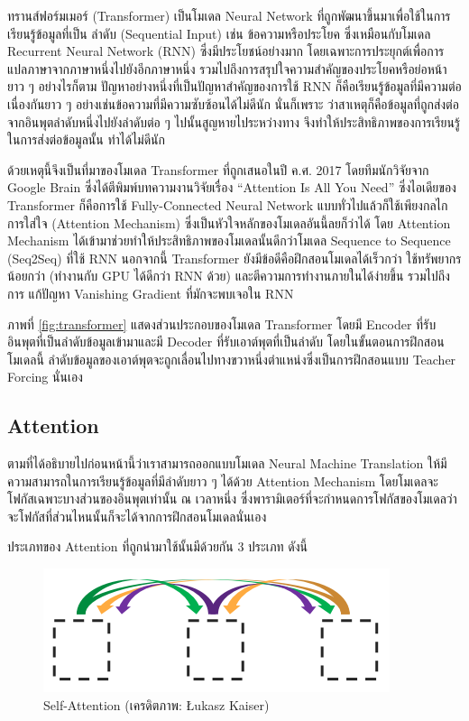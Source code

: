 ทรานส์ฟอร์มเมอร์ (Transformer)\autocite{vaswani2017a} เป็นโมเดล Neural Network ที่ถูกพัฒนาขึ้นมาเพื่อใช้ในการเรียนรู้ข้อมูลที่เป็น%
ลำดับ (Sequential Input) เช่น ข้อความหรือประโยค ซึ่งเหมือนกับโมเดล Recurrent Neural Network (RNN) ซึ่งมีประโยชน์อย่างมาก%
โดยเฉพาะการประยุกต์เพื่อการแปลภาษาจากภาษาหนึ่งไปยังอีกภาษาหนึ่ง รวมไปถึงการสรุปใจความสำคัญของประโยคหรือย่อหน้ายาว ๆ อย่างไรก็ตาม 
ปัญหาอย่างหนึ่งที่เป็นปัญหาสำคัญของการใช้ RNN ก็คือเรียนรู้ข้อมูลที่มีความต่อเนื่องกันยาว ๆ อย่างเช่นข้อความที่มีความซับซ้อนได้ไม่ดีนัก นั่นก็เพราะ%
ว่าสาเหตุก็คือข้อมูลที่ถูกส่งต่อจากอินพุตลำดับหนึ่งไปยังลำดับต่อ ๆ ไปนั้นสูญหายไประหว่างทาง จึงทำให้ประสิทธิภาพของการเรียนรู้ในการส่งต่อข้อมูลนั้น%
ทำได้ไม่ดีนัก

ด้วยเหตุนี้จึงเป็นที่มาของโมเดล Transformer ที่ถูกเสนอในปี ค.ศ. 2017 โดยทีมนักวิจัยจาก Google Brain ซึ่งได้ตีพิมพ์บทความงานวิจัยเรื่อง 
\enquote{Attention Is All You Need}\autocite{vaswani2017a} ซึ่งไอเดียของ Transformer ก็คือการใช้ Fully-Connected 
Neural Network แบบทั่วไปแล้วก็ใช้เพียงกลไกการใส่ใจ (Attention Mechanism) ซึ่งเป็นหัวใจหลักของโมเดลอันนี้ลยก็ว่าได้ โดย Attention 
Mechanism ได้เข้ามาช่วยทำให้ประสิทธิภาพของโมเดลนั้นดีกว่าโมเดล Sequence to Sequence (Seq2Seq) ที่ใช้ RNN นอกจากนี้ Transformer 
ยังมีข้อดีคือฝึกสอนโมเดลได้เร็วกว่า ใช้ทรัพยากรน้อยกว่า (ทำงานกับ GPU ได้ดีกว่า RNN ด้วย) และตีความการทำงานภายในได้ง่ายขึ้น รวมไปถึงการ%
แก้ปัญหา Vanishing Gradient ที่มักจะพบเจอใน RNN 

ภาพที่ \ref{fig:transformer} แสดงส่วนประกอบของโมเดล Transformer โดยมี Encoder ที่รับอินพุตที่เป็นลำดับข้อมูลเข้ามาและมี Decoder 
ที่รับเอาต์พุตที่เป็นลำดับ โดยในขั้นตอนการฝึกสอนโมเดลนี้ ลำดับข้อมูลของเอาต์พุตจะถูกเลื่อนไปทางขวาหนึ่งตำแหน่งซึ่งเป็นการฝึกสอนแบบ Teacher 
Forcing นั่นเอง

\subsection{Attention}
\label{ssec:attention}

ตามที่ได้อธิบายไปก่อนหน้านี้ว่าเราสามารถออกแบบโมเดล Neural Machine Translation ให้มีความสามารถในการเรียนรู้ข้อมูลที่มีลำดับยาว ๆ 
ได้ด้วย Attention Mechanism โดยโมเดลจะโฟกัสเฉพาะบางส่วนของอินพุตเท่านั้น ณ เวลาหนึ่ง ซึ่งพารามิเตอร์ที่จะกำหนดการโฟกัสของโมเดลว่า%
จะโฟกัสที่ส่วนไหนนั้นก็จะได้จากการฝึกสอนโมเดลนั่นเอง

ประเภทของ Attention ที่ถูกนำมาใช้นั้นมีด้วยกัน 3 ประเภท ดังนี้

\begin{figure}[htbp]
    \centering
    \includegraphics[width=0.6\linewidth]{fig/attention_1_self.png}
    \caption{Self-Attention (เครดิตภาพ: Łukasz Kaiser)}
    \label{fig:self_attention}
\end{figure}

